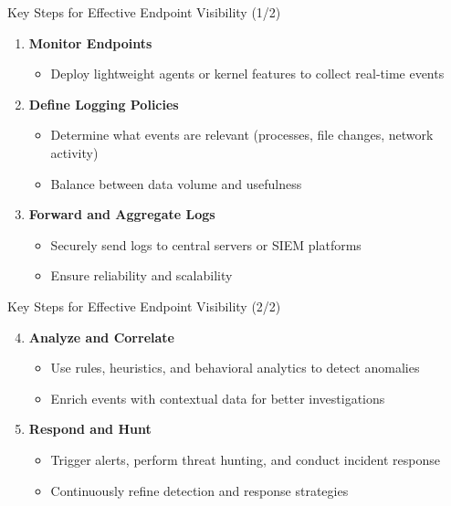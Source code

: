 \documentclass[12pt,aspectratio=169, colorlinks=true, linkcolor=circlBlue]{beamer}
\begin{document}
\begin{frame}{Key Steps for Effective Endpoint Visibility (1/2)}
	\begin{enumerate}
		\item \textbf{Monitor Endpoints}
		      \begin{itemize}
			      \item Deploy lightweight agents or kernel features to collect real-time events
		      \end{itemize}

		\item \textbf{Define Logging Policies}
		      \begin{itemize}
			      \item Determine what events are relevant (processes, file changes, network activity)
			      \item Balance between data volume and usefulness
		      \end{itemize}

		\item \textbf{Forward and Aggregate Logs}
		      \begin{itemize}
			      \item Securely send logs to central servers or SIEM platforms
			      \item Ensure reliability and scalability
		      \end{itemize}
	\end{enumerate}
\end{frame}

\begin{frame}{Key Steps for Effective Endpoint Visibility (2/2)}
	\begin{enumerate}
		\setcounter{enumi}{3}
		\item \textbf{Analyze and Correlate}
		      \begin{itemize}
			      \item Use rules, heuristics, and behavioral analytics to detect anomalies
			      \item Enrich events with contextual data for better investigations
		      \end{itemize}

		\item \textbf{Respond and Hunt}
		      \begin{itemize}
			      \item Trigger alerts, perform threat hunting, and conduct incident response
			      \item Continuously refine detection and response strategies
		      \end{itemize}
	\end{enumerate}
\end{frame}
\end{document}
